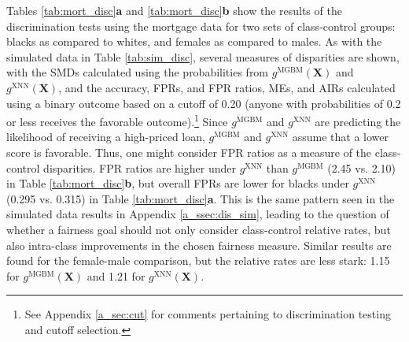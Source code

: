 \documentclass[information,article,submit,moreauthors,pdftex]{definitions/mdpi}
\begin{document}
Tables \ref{tab:mort_disc}\textbf{a} and \ref{tab:mort_disc}\textbf{b} show the results of the discrimination tests using the mortgage data for two sets of class-control groups: blacks as compared to whites, and females as compared to males. As with the simulated data in Table \ref{tab:sim_disc}, several measures of disparities are shown, with the SMDs calculated using the probabilities from $g^{\text{MGBM}}(\mathbf{X})$ and $g^{\text{XNN}}(\mathbf{X})$, and the accuracy, FPRs, and  FPR ratios, MEs, and AIRs calculated using a binary outcome based on a cutoff of 0.20 (anyone with probabilities of 0.2 or less receives the favorable outcome).\footnote{See Appendix \ref{a_sec:cut} for comments pertaining to discrimination testing and cutoff selection.} Since $g^{\text{MGBM}}$ and $g^{\text{XNN}}$  are predicting the likelihood of receiving a high-priced loan, $g^{\text{MGBM}}$ and $g^{\text{XNN}}$ assume that a lower score is favorable.  Thus, one might consider FPR ratios as a measure of the class-control disparities. FPR ratios are higher under $g^{\text{XNN}}$ than $g^{\text{MGBM}}$ (2.45 vs. 2.10) in Table \ref{tab:mort_disc}\textbf{b}, but overall FPRs are lower for blacks under $g^{\text{XNN}}$ (0.295 vs. 0.315) in Table \ref{tab:mort_disc}\textbf{a}.  This is the same pattern seen in the simulated data results in Appendix \ref{a_ssec:dis_sim}, leading to the question of whether a fairness goal should not only consider class-control relative rates, but also intra-class improvements in the chosen fairness measure.  Similar results are found for the female-male comparison, but the relative rates are less stark: 1.15 for $g^{\text{MGBM}}(\mathbf{X})$ and 1.21 for $g^{\text{XNN}}(\mathbf{X})$.
\end{document}
